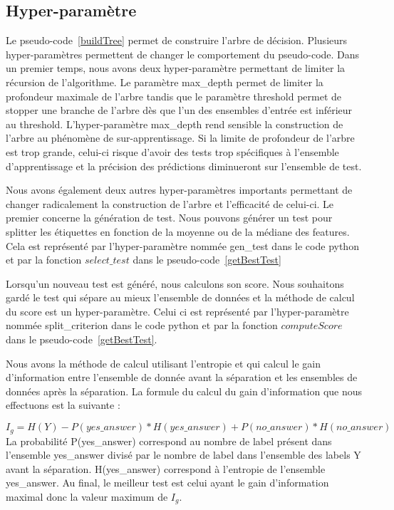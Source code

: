 \documentclass[french, 14pt]{memoir}
\begin{document}
\subsection{Hyper-paramètre}

Le pseudo-code~\ref{buildTree} permet de construire l'arbre de décision. Plusieurs hyper-paramètres permettent de changer le comportement du pseudo-code. Dans un premier temps, nous avons deux hyper-paramètre permettant de limiter la récursion de l'algorithme. Le paramètre max\_depth permet de limiter la profondeur maximale de l'arbre tandis que le paramètre threshold permet de stopper une branche de l'arbre dès que l'un des ensembles d'entrée est inférieur au threshold. L'hyper-paramètre max\_depth rend sensible la construction de l'arbre au phénomène de sur-apprentissage. Si la limite de profondeur de l'arbre est trop grande, celui-ci risque d'avoir des tests trop spécifiques à l'ensemble d'apprentissage et la précision des prédictions diminueront sur l'ensemble de test.

Nous avons également deux autres hyper-paramètres importants permettant de changer radicalement la construction de l'arbre et l'efficacité de celui-ci. Le premier concerne la génération de test. Nous pouvons générer un test pour splitter les étiquettes en fonction de la moyenne ou de la médiane des features. Cela est représenté par l'hyper-paramètre nommée gen\_test dans le code python et par la fonction $select\_test$ dans le pseudo-code~\ref{getBestTest}

Lorsqu'un nouveau test est généré, nous calculons son score. Nous souhaitons gardé le test qui sépare au mieux l'ensemble de données et la méthode de calcul du score est un hyper-paramètre. Celui ci est représenté par l'hyper-paramètre nommée split\_criterion dans le code python et par la fonction $computeScore$ dans le pseudo-code~\ref{getBestTest}.

 Nous avons la méthode de calcul utilisant l'entropie et qui calcul le gain d'information entre l'ensemble de donnée avant la séparation et les ensembles de données après la séparation. La formule du calcul du gain d'information que nous effectuons est la suivante :

\begin{equation}
I_{g} = H(Y) - P(yes\_answer) * H(yes\_answer) + P(no\_answer) * H(no\_answer)
\end{equation}
La probabilité P(yes\_answer) correspond au nombre de label présent dans l'ensemble yes\_answer divisé par le nombre de label dans l'ensemble des labels Y avant la séparation. H(yes\_answer) correspond à l'entropie de l'ensemble yes\_answer. Au final, le meilleur test est celui ayant le gain d'information maximal donc la valeur maximum de $I_g$.
\end{document}
